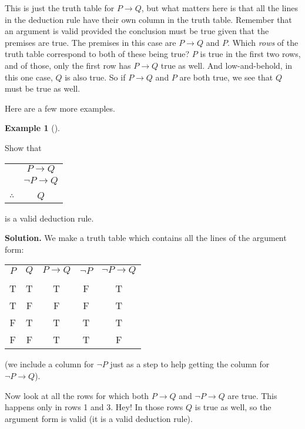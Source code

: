 \documentclass[10pt,]{book}
\theoremstyle{plain}
\theoremstyle{definition}
\newtheorem{example}[theorem]{Example}
\theoremstyle{definition}
\theoremstyle{definition}
\numberwithin{equation}{chapter}
\newcommand{\hrulethin}  {\noalign{\hrule height 0.04em}}
\def\imp{\rightarrow}
\begin{document}
          This is just the truth table for \(P \imp Q\), but what matters here is that all the lines in the deduction rule have their own column in the truth table. Remember that an argument is valid provided the conclusion must be true given that the premises are true. The premises in this case are \(P \imp Q\) and \(P\). Which \emph{rows} of the truth table correspond to both of these being true? \(P\) is true in the first two rows, and of those, only the first row has \(P \imp Q\) true as well. And low-and-behold, in this one case, \(Q\) is also true. So if \(P\imp Q\) and \(P\) are both true, we see that \(Q\) must be true as well.
\par

          Here are a few more examples.
\begin{example}[]\label{example-85}

              Show that
\leavevmode%
\begin{table}
\centering
\begin{tabular}{cc}
&\(P \imp Q\)\tabularnewline[0pt]
&\(\neg P \imp Q\)\tabularnewline[0pt]
&\tabularnewline\hrulethin
\(\therefore\)&\(Q\)
\end{tabular}
\end{table}
\par

              is a valid deduction rule.
\par\medskip\noindent%
\textbf{Solution.}\quad
              We make a truth table which contains all the lines of the argument form:
\leavevmode%
\begin{table}
\centering
\begin{tabular}{ccccc}
\(P\)&\(Q\)&\(P\imp Q\)&\(\neg P\)&\(\neg P \imp Q\)\tabularnewline[0pt]
&&&&\tabularnewline\hrulethin
T&T&T&F&T\tabularnewline[0pt]
T&F&F&F&T\tabularnewline[0pt]
F&T&T&T&T\tabularnewline[0pt]
F&F&T&T&F
\end{tabular}
\end{table}
\par

              (we include a column for \(\neg P\) just as a step to help getting the column for \(\neg P \imp Q\)).
\par

              Now look at all the rows for which both \(P \imp Q\) and \(\neg P \imp Q\) are true. This happens only in rows 1 and 3. Hey! In those rows \(Q\) is true as well, so the argument form is valid (it is a valid deduction rule).
\end{example}
\end{document}
